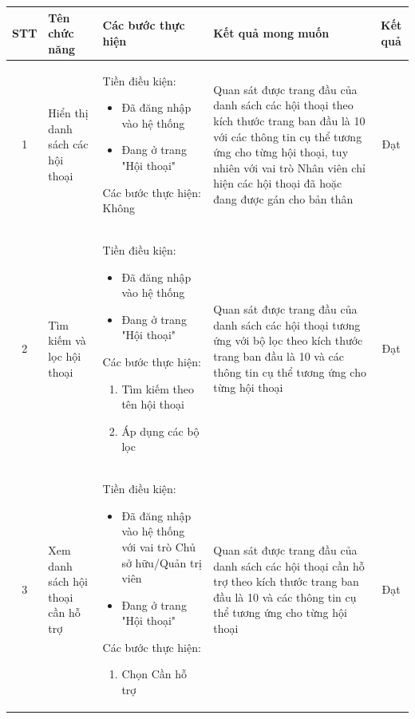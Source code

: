 \begin{longtable}{|c|m{2.5cm}|m{5.5cm}|m{4.5cm}|c|}
    \hline
    \textbf{STT} & \textbf{Tên chức năng} & \textbf{Các bước thực hiện} & \textbf{Kết quả mong muốn} & \textbf{Kết quả} \\
    \hline
    1 & 
    Hiển thị danh sách các hội thoại & 
    Tiền điều kiện:
    \begin{itemize}
        \item Đã đăng nhập vào hệ thống
        \item Đang ở trang "Hội thoại"
    \end{itemize}
    Các bước thực hiện: Không
    & 
    Quan sát được trang đầu của danh sách các hội thoại theo kích thước trang ban đầu là 10 với các thông tin cụ thể tương ứng cho từng hội thoại, tuy nhiên với vai trò Nhân viên chỉ hiện các hội thoại đã hoặc đang được gán cho bản thân& Đạt \\
    \hline
    2 & 
    Tìm kiếm và lọc hội thoại & 
    Tiền điều kiện:
    \begin{itemize}
        \item Đã đăng nhập vào hệ thống
        \item Đang ở trang "Hội thoại"
    \end{itemize}
    Các bước thực hiện: 
    \begin{enumerate}[label=\arabic*.]
        \item Tìm kiếm theo tên hội thoại
        \item Áp dụng các bộ lọc
    \end{enumerate}
    & 
    Quan sát được trang đầu của danh sách các hội thoại tương ứng với bộ lọc theo kích thước trang ban đầu là 10 và các thông tin cụ thể tương ứng cho từng hội thoại & Đạt \\
    \hline
    3 & 
    Xem danh sách hội thoại cần hỗ trợ & 
    Tiền điều kiện:
    \begin{itemize}
        \item Đã đăng nhập vào hệ thống với vai trò Chủ sở hữu/Quản trị viên
        \item Đang ở trang "Hội thoại"
    \end{itemize}
    Các bước thực hiện: 
    \begin{enumerate}[label=\arabic*.]
        \item Chọn Cần hỗ trợ
    \end{enumerate}
    & 
    Quan sát được trang đầu của danh sách các hội thoại cần hỗ trợ theo kích thước trang ban đầu là 10 và các thông tin cụ thể tương ứng cho từng hội thoại & Đạt \\

\end{longtable}
